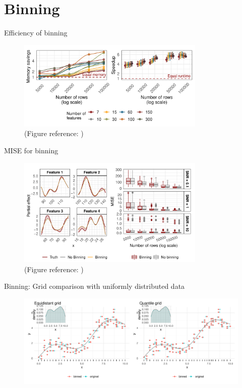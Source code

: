 \documentclass[t,10pt]{beamer}
\begin{document}
\section*{Binning}

\begin{frame}{Efficiency of binning}
    \begin{figure}
        \centering
        \includegraphics[width=0.8\textwidth]{figures/fig-binning-mem-runtime.png}
        \caption{\small(Figure reference: \citet{schalk2022accelerated})}
    \end{figure}
\end{frame}

\begin{frame}{MISE for binning}
    \begin{figure}
        \centering
        \includegraphics[width=0.8\textwidth]{figures/fig-binning-mise.png}
        \caption{\small(Figure reference: \citet{schalk2022accelerated})}
    \end{figure}
\end{frame}

\begin{frame}{Binning: Grid comparison with uniformly distributed data}
    \begin{figure}
        \centering
        \includegraphics[width=\textwidth]{figures/fig-bin-uni.pdf}
    \end{figure} 
\end{frame}
\end{document}
